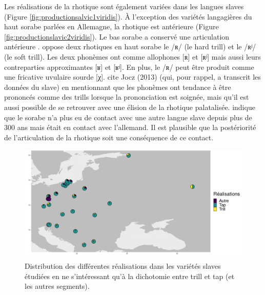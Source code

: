 Les réalisations de la rhotique sont également variées dans les langues slaves (Figure \ref{fig:productionsalvic1viridis}). À l'exception des variétés langagières du haut sorabe parlées en Allemagne, la rhotique est antérieure (Figure \ref{fig:productionslavic2viridis}). Le bas sorabe a conservé une articulation antérieure \parencite{howsonRhoticsPalatalizationAcoustic2018}. \textcite{howsonUpperSorbian2017} oppose deux rhotiques en haut sorabe le /ʀ/ (le hard trill) et le /ʀʲ/ (le soft trill). Les deux phonèmes ont comme allophones [ʀ] et [ʀʲ] mais aussi leurs contreparties approximantes [ʁ] et [ʁʲ]. En plus, le /ʀ/ peut être produit comme une fricative uvulaire sourde [χ]. \textcite{howsonUpperSorbian2017} cite Jocz (2013) (qui, pour rappel, a transcrit les données du slave) en mentionnant que les phonèmes ont tendance à être prononcés comme des trills lorsque la prononciation est soignée, mais qu'il est aussi possible de se retrouver avec une élision de la rhotique palatalisée.  \textcite[440]{schaarschmidtRuleConvergenceLanguage1997} indique que le sorabe n'a plus eu de contact avec une autre langue slave depuis plus de 300 ans mais était en contact avec l'allemand. Il est plausible que la postériorité de l'articulation de la rhotique soit une conséquence de ce contact.\\


\begin{figure}
	\centering
	\includegraphics[width=1\linewidth]{substance/images/productionslavic_3_viridis}
	\caption[Distribution des différentes réalisations dans les variétés slaves pour le trill et tap]{Distribution des différentes réalisations dans les variétés slaves étudiées en ne s'intéressant qu'à la dichotomie entre trill et tap (et les autres segments).}
	\label{fig:productionslavic3viridis}
\end{figure}

